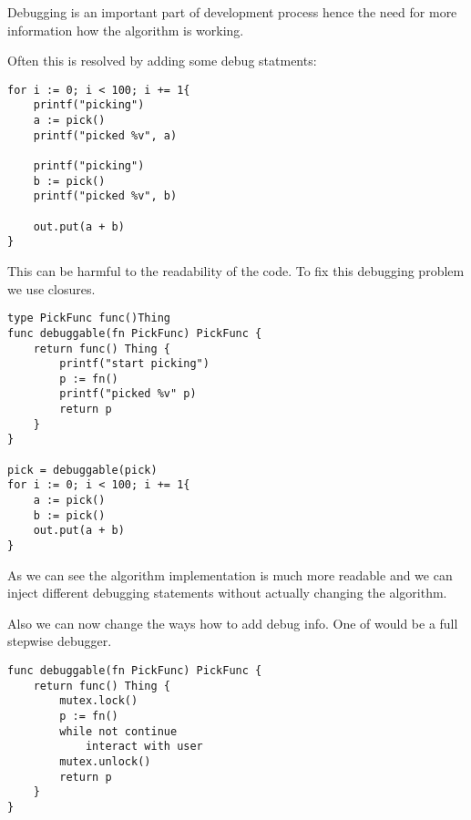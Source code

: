 
Debugging is an important part of development process hence the need for more information how the algorithm is working.


Often this is resolved by adding some debug statments:

\begin{verbatim}
for i := 0; i < 100; i += 1{
    printf("picking")
    a := pick()
    printf("picked %v", a)

    printf("picking")
    b := pick()
    printf("picked %v", b)
    
    out.put(a + b)
}
\end{verbatim}

This can be harmful to the readability of the code. To fix this debugging problem we use closures.

\begin{verbatim}
type PickFunc func()Thing
func debuggable(fn PickFunc) PickFunc {
    return func() Thing {
        printf("start picking")
        p := fn()
        printf("picked %v" p)
        return p
    }
}

pick = debuggable(pick)
for i := 0; i < 100; i += 1{
    a := pick()
    b := pick()
    out.put(a + b)
}
\end{verbatim}

As we can see the algorithm implementation is much more readable and 
we can inject different debugging statements without actually changing the algorithm.

Also we can now change the ways how to add debug info. One of would 
be a full stepwise debugger.

\begin{verbatim}
func debuggable(fn PickFunc) PickFunc {
    return func() Thing {
        mutex.lock()
        p := fn()
        while not continue
            interact with user
        mutex.unlock()
        return p
    }
}
\end{verbatim}